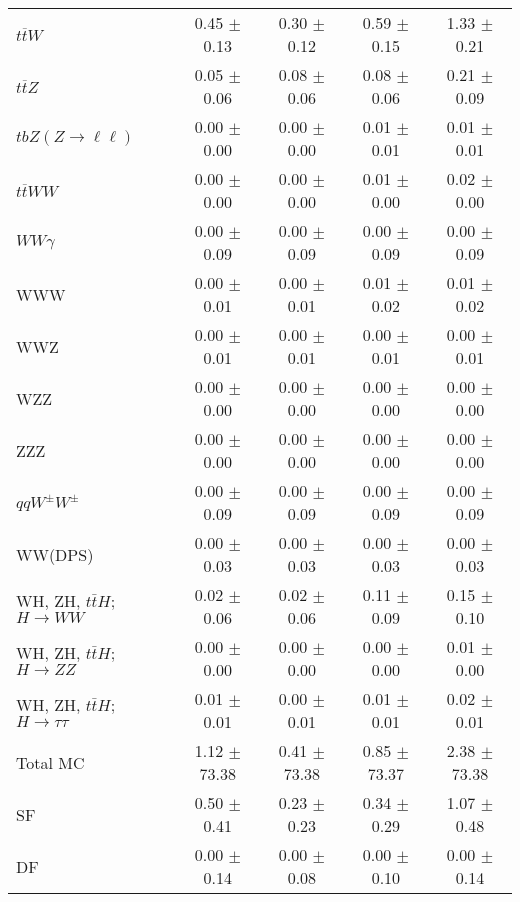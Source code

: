 \begin{tabular}{l|cccc}
                   $t\overline{t}W$ &  0.45 $\pm$  0.13 &  0.30 $\pm$  0.12 &  0.59 $\pm$  0.15 &  1.33 $\pm$  0.21 \\
                   $t\overline{t}Z$ &  0.05 $\pm$  0.06 &  0.08 $\pm$  0.06 &  0.08 $\pm$  0.06 &  0.21 $\pm$  0.09 \\
    $tbZ (Z \rightarrow \ell \ell)$ &  0.00 $\pm$  0.00 &  0.00 $\pm$  0.00 &  0.01 $\pm$  0.01 &  0.01 $\pm$  0.01 \\
                  $t\overline{t}WW$ &  0.00 $\pm$  0.00 &  0.00 $\pm$  0.00 &  0.01 $\pm$  0.00 &  0.02 $\pm$  0.00 \\
                         $WW\gamma$ &  0.00 $\pm$  0.09 &  0.00 $\pm$  0.09 &  0.00 $\pm$  0.09 &  0.00 $\pm$  0.09 \\
                                WWW &  0.00 $\pm$  0.01 &  0.00 $\pm$  0.01 &  0.01 $\pm$  0.02 &  0.01 $\pm$  0.02 \\
                                WWZ &  0.00 $\pm$  0.01 &  0.00 $\pm$  0.01 &  0.00 $\pm$  0.01 &  0.00 $\pm$  0.01 \\
                                WZZ &  0.00 $\pm$  0.00 &  0.00 $\pm$  0.00 &  0.00 $\pm$  0.00 &  0.00 $\pm$  0.00 \\
                                ZZZ &  0.00 $\pm$  0.00 &  0.00 $\pm$  0.00 &  0.00 $\pm$  0.00 &  0.00 $\pm$  0.00 \\
                 $qqW^{\pm}W^{\pm}$ &  0.00 $\pm$  0.09 &  0.00 $\pm$  0.09 &  0.00 $\pm$  0.09 &  0.00 $\pm$  0.09 \\
                            WW(DPS) &  0.00 $\pm$  0.03 &  0.00 $\pm$  0.03 &  0.00 $\pm$  0.03 &  0.00 $\pm$  0.03 \\
WH, ZH, $t\bar{t}H$; $H \rightarrow WW$ &  0.02 $\pm$  0.06 &  0.02 $\pm$  0.06 &  0.11 $\pm$  0.09 &  0.15 $\pm$  0.10 \\
WH, ZH, $t\bar{t}H$; $H \rightarrow ZZ$ &  0.00 $\pm$  0.00 &  0.00 $\pm$  0.00 &  0.00 $\pm$  0.00 &  0.01 $\pm$  0.00 \\
WH, ZH, $t\bar{t}H$; $H \rightarrow \tau\tau$ &  0.01 $\pm$  0.01 &  0.00 $\pm$  0.01 &  0.01 $\pm$  0.01 &  0.02 $\pm$  0.01 \\
\hline\hline
                           Total MC &  1.12 $\pm$ 73.38 &  0.41 $\pm$ 73.38 &  0.85 $\pm$ 73.37 &  2.38 $\pm$ 73.38 \\
\hline
                                 SF &  0.50 $\pm$  0.41 &  0.23 $\pm$  0.23 &  0.34 $\pm$  0.29 &  1.07 $\pm$  0.48 \\
                                 DF &  0.00 $\pm$  0.14 &  0.00 $\pm$  0.08 &  0.00 $\pm$  0.10 &  0.00 $\pm$  0.14 \\

\end{tabular}
